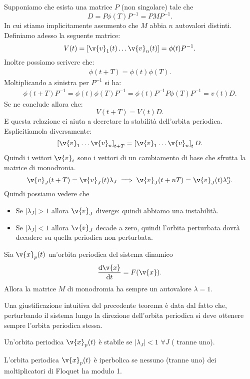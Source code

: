 \noindent
Supponiamo che esista una matrice $P$  (non singolare) tale che 
\[
    D = P\phi (T) P^{-1} = PMP^{-1}
.\] 
In cui stiamo implicitamente assumento che $M$  abbia $n$  autovalori distinti.\\
Definiamo adesso la seguente matrice:
\[
    V(t) = \left[\v{v}_1(t) \ldots\v{v}_n(t) \right]= \phi (t) P^{-1}
.\] 
Inoltre possiamo scrivere che:
\[\begin{aligned}
    \phi (t+T) = \phi (t) \phi (T) 
.\end{aligned}\]
Moltiplicando a sinistra per $P^{-1}$  si ha:
\[\begin{aligned}
    \phi (t + T) P^{-1}= \phi (t) \phi (T) P^{-1}=\phi (t) P^{-1}P\phi (T) P^{-1} = v(t) D
.\end{aligned}\]
Se ne conclude allora che:
\[
    V(t+T) = V(t) D
.\] 
E questa relazione ci aiuta a decretare la stabilità dell'orbita periodica. Esplicitiamola diversamente:
\[
    \left[\v{v}_1\ldots\v{v}_n\right]_{t + T} = \left[\v{v}_1\ldots\v{v}_n\right]_{t} D
.\] 
Quindi i vettori $\v{v}_i$  sono i vettori di un cambiamento di base che sfrutta la matrice di monodronia.
\[
    \v{v}_J(t+T) = \v{v}_J(t) \lambda_J\implies\v{v}_J(t+nT) = \v{v}_J(t) \lambda^n_J
.\] 
Quindi possiamo vedere che
\begin{itemize}
    \item Se $\left|\lambda_J\right|>1$ allora $\v{v}_J$ diverge: quindi abbiamo una instabilità.
    \item Se $\left|\lambda_J\right|<1$ allora $\v{v}_J$ decade a zero, quindi l'orbita perturbata dovrà decadere su quella periodica non perturbata.
\end{itemize}
\begin{thm}[]
    Sia $\v{x}_p(t) $  un'orbita periodica del sistema dinamico
    \[
	\frac{\text{d} \v{x}}{\text{d} t} = F(\v{x}) 
    .\] 
    Allora la matrice $M$ di monodromia ha sempre un autovalore $\lambda =1$.
\end{thm}
\noindent
Una giustificazione intuitiva del precedente teorema è data dal fatto che, perturbando il sistema lungo la direzione dell'orbita periodica si deve ottenere sempre l'orbita periodica stessa.
\begin{defn}[Stabilità]
    Un'orbita periodica $\v{x}_p(t)$ è stabile se $\left|\lambda_J\right|<1$ $\forall J$ ( tranne uno).
\end{defn}
\noindent
\begin{defn}
    L'orbita periodica $\v{x}_p(t) $ è iperbolica se nessuno (tranne uno) dei moltiplicatori di Floquet ha modulo 1.
\end{defn}
